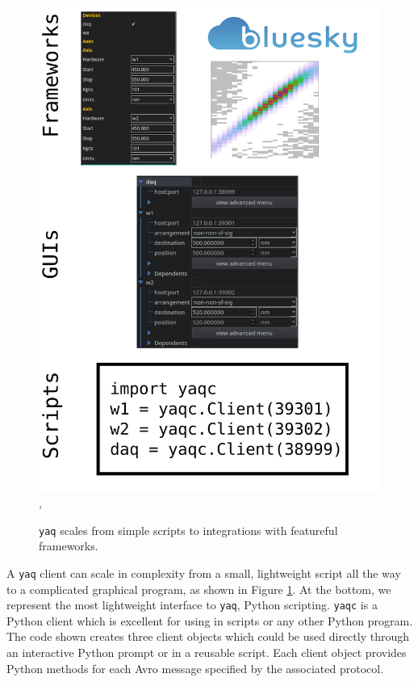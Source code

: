 \documentclass[aip, amsmath, amssymb, reprint,]{revtex4-1}
\newcommand\yaq{\texttt{yaq}}
\begin{document}
\begin{figure}
\includegraphics[width=\columnwidth]{figures/client_spectrum},
	\caption{  \label{fig:foundation} \yaq{} scales from simple scripts to integrations with featureful frameworks.}
\end{figure}


A \yaq{} client can scale in complexity from a small, lightweight script all the way to a complicated graphical program, as shown in Figure \ref{fig:foundation}.
At the bottom, we represent the most lightweight interface to \yaq{}, Python scripting.
\texttt{yaqc}\cite{yaqc} is a Python client which is excellent for using in scripts or any other Python program.
The code shown creates three client objects which could be used directly through an interactive Python prompt or in a reusable script.
Each client object provides Python methods for each Avro message specified by the associated protocol.
\end{document}
